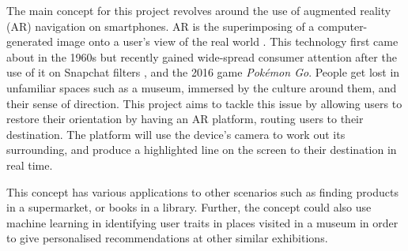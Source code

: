 
{
The main concept for this project revolves around the use of augmented reality (AR) navigation on smartphones. AR is the superimposing of a computer-generated image onto a user's view of the real world \cite{oxforddict}. This technology first came about in the 1960s \cite{InteractionDesign} but recently gained wide-spread consumer attention after the use of it on Snapchat filters \cite{Snapchat}, and the 2016 game \textit{Pokémon Go}. People get lost in unfamiliar spaces such as a museum, immersed by the culture around them, and their sense of direction. This project aims to tackle this issue by allowing users to restore their orientation by having an AR platform, routing users to their destination. The platform will use the device's camera to work out its surrounding, and produce a highlighted line on the screen to their destination in real time.

This concept has various applications to other scenarios such as finding products in a supermarket, or books in a library. Further, the concept could also use machine learning in identifying user traits in places visited in a museum in order to give personalised recommendations at other similar exhibitions.

}